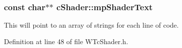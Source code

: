 \hypertarget{classc_shader_a181f19f059df6cb1054babb884587fa1}{
\subsubsection[{mpShaderText}]{\setlength{\rightskip}{0pt plus 5cm}const char$\ast$$\ast$ {\bf cShader::mpShaderText}}}
\label{classc_shader_a181f19f059df6cb1054babb884587fa1}


This will point to an array of strings for each line of code. 



Definition at line 48 of file WTcShader.h.

